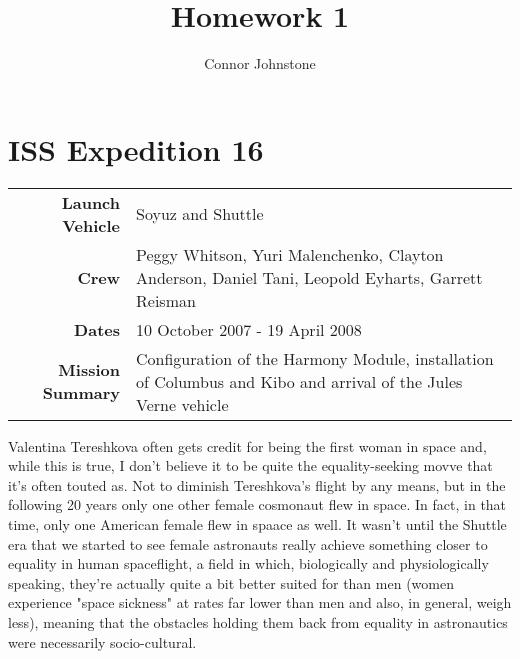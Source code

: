 \documentclass{article}
\begin{document}
  \title{Homework 1}
  \author{Connor Johnstone}

  \maketitle

  \section{ISS Expedition 16}

  \begin{center}
    \begin{tabular}{ >{\bfseries}r | p{3.5in} }
      \hline
      Launch Vehicle & Soyuz and Shuttle \\
      Crew & Peggy Whitson, 
             Yuri Malenchenko, 
             Clayton Anderson, 
             Daniel Tani,
             Leopold Eyharts, 
             Garrett Reisman \\
      Dates & 10 October 2007 - 19 April 2008 \\
      Mission Summary & Configuration of the Harmony Module, installation of
      Columbus and Kibo and arrival of the Jules Verne vehicle \\
      \hline
    \end{tabular}
  \end{center}


  Valentina Tereshkova often gets credit for being the first woman in space and,
  while this is true, I don't believe it to be quite the equality-seeking movve
  that it's often touted as. Not to diminish Tereshkova's flight by any means, but
  in the following 20 years only one other female cosmonaut flew in space.
  In fact, in that time, only one American female flew in
  spaace as well. It wasn't until the Shuttle era that we started to see female
  astronauts really achieve something closer to equality in human spaceflight,
  a field in which, biologically and physiologically speaking, they're actually
  quite a bit better suited for than men (women experience "space sickness" at
  rates far lower than men and also, in general, weigh less), meaning that the
  obstacles holding them back from equality in astronautics were necessarily
  socio-cultural.
\end{document}
